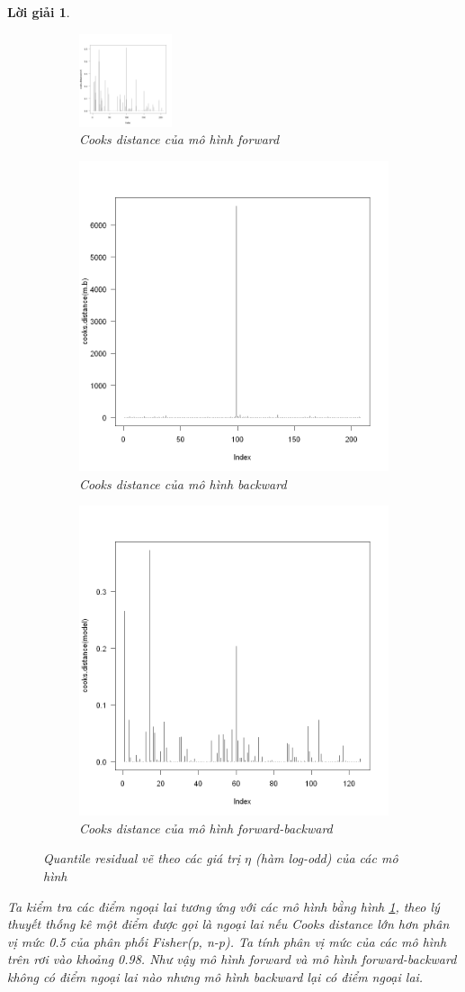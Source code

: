 \documentclass[14pt, a4paper]{article}
\theoremstyle{sltheorem}
\theoremstyle{soltheorem}
\newtheorem*{loigiai}{Lời giải}
\begin{document}
\begin{loigiai}
    \begin{figure}[h!]
        \centering
        \begin{subfigure}[b]{\textwidth}
            \includegraphics[width=0.3\textwidth]{figures/mf_cooks.png}
            \caption{Cooks distance của mô hình forward}
        \end{subfigure}
        \hfill
        \begin{subfigure}[b]{\linewidth}
            \includegraphics[width=0.3\linewidth]{figures/mb_cooks.png}
            \caption{Cooks distance của mô hình backward}
        \end{subfigure}
        \hfill
        \begin{subfigure}[b]{\textwidth}
            \includegraphics[width=0.3\linewidth]{figures/mbo_cooks.png}
            \caption{Cooks distance của mô hình forward-backward}
        \end{subfigure}
        \caption{Quantile residual vẽ theo các giá trị $\eta$ (hàm log-odd) của các mô hình}
        \label{fig:Cooks}
    \end{figure}
    
    Ta kiểm tra các điểm ngoại lai tương ứng với các mô hình bằng hình \ref{fig:Cooks}, theo lý thuyết thống kê một điểm được gọi là ngoại lai nếu Cooks distance lớn hơn phân vị mức 0.5 của phân phối Fisher(p, n-p).
    Ta tính phân vị mức của các mô hình trên rơi vào khoảng 0.98.
    Như vậy mô hình forward và mô hình forward-backward không có điểm ngoại lai nào nhưng mô hình backward lại có điểm ngoại lai.


\end{loigiai}
\end{document}
